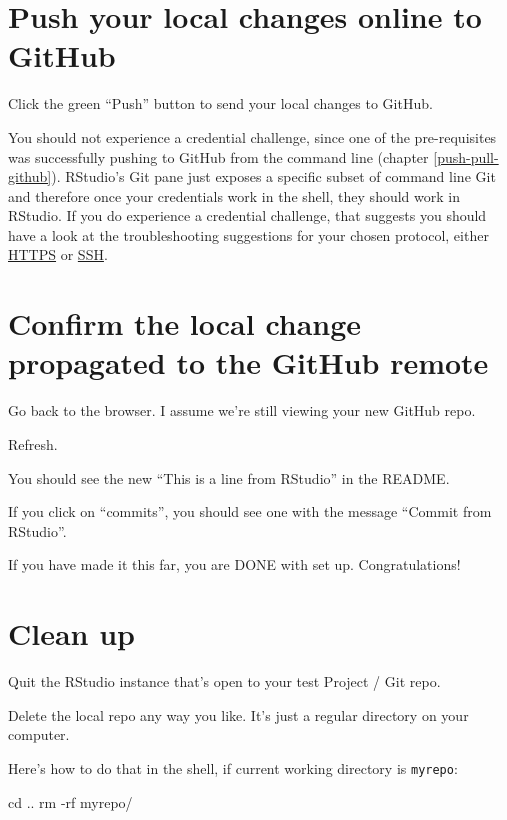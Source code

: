 \documentclass[
]{book}
\newenvironment{Shaded}{\begin{snugshade}}{\end{snugshade}}
\newcommand{\NormalTok}[1]{#1}
\begin{document}
\section{Push your local changes online to GitHub}\label{push-your-local-changes-online-to-github}

Click the green ``Push'' button to send your local changes to GitHub.

You should not experience a credential challenge, since one of the pre-requisites was successfully pushing to GitHub from the command line (chapter \ref{push-pull-github}).
RStudio's Git pane just exposes a specific subset of command line Git and therefore once your credentials work in the shell, they should work in RStudio.
If you do experience a credential challenge, that suggests you should have a look at the troubleshooting suggestions for your chosen protocol, either \hyperref[pat-troubleshooting]{HTTPS} or \hyperref[ssh-troubleshooting]{SSH}.

\section{Confirm the local change propagated to the GitHub remote}\label{confirm-the-local-change-propagated-to-the-github-remote-1}

Go back to the browser.
I assume we're still viewing your new GitHub repo.

Refresh.

You should see the new ``This is a line from RStudio'' in the README.

If you click on ``commits'', you should see one with the message ``Commit from RStudio''.

If you have made it this far, you are DONE with set up.
Congratulations!

\section{Clean up}\label{clean-up-1}

Quit the RStudio instance that's open to your test Project / Git repo.

Delete the local repo any way you like.
It's just a regular directory on your computer.

Here's how to do that in the shell, if current working directory is \texttt{myrepo}:

\begin{Shaded}
\begin{Highlighting}[]
\NormalTok{cd ..}
\NormalTok{rm {-}rf myrepo/}
\end{Highlighting}
\end{Shaded}
\end{document}
